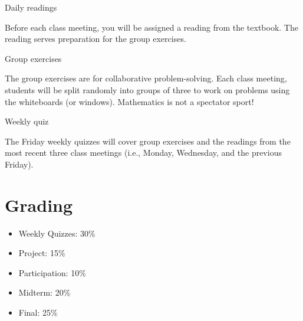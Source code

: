 \documentclass[letterpaper]{inzane_syllabus} %
\begin{document}

\vspace{0.1cm} 

{\color{myCOLOR} Daily readings}

Before each class meeting, you will be assigned a reading from the textbook. The reading serves preparation for the group exercises. %


{\color{myCOLOR} Group exercises}

The group exercises are for collaborative problem-solving.  Each class meeting, students will be split randomly into groups of three to work on problems using the whiteboards (or windows). Mathematics is not a spectator sport!



{\color{myCOLOR} Weekly quiz}

The Friday weekly quizzes will cover group exercises and the readings from the most recent three class meetings (i.e., Monday, Wednesday, and the previous Friday). 



\newpage %

\makeSide %


\vspace{0.2cm}
\section{Grading}

\begin{itemize}
\item Weekly Quizzes: 30\%  
\item Project: 15\% 
\item Participation: 10\% 
\item Midterm: 20\%
\item Final: 25\%
\end{itemize}
\end{document}
